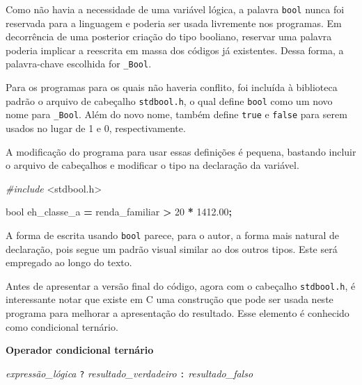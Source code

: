 \documentclass[
  11pt,
  a4paper,
]{scrbook}
\newenvironment{Shaded}{\begin{snugshade}}{\end{snugshade}}
\newcommand{\DataTypeTok}[1]{\textcolor[rgb]{0.13,0.29,0.53}{#1}}
\newcommand{\DecValTok}[1]{\textcolor[rgb]{0.00,0.00,0.81}{#1}}
\newcommand{\FloatTok}[1]{\textcolor[rgb]{0.00,0.00,0.81}{#1}}
\newcommand{\ImportTok}[1]{#1}
\newcommand{\NormalTok}[1]{#1}
\newcommand{\OperatorTok}[1]{\textcolor[rgb]{0.81,0.36,0.00}{\textbf{#1}}}
\newcommand{\PreprocessorTok}[1]{\textcolor[rgb]{0.56,0.35,0.01}{\textit{#1}}}
\begin{document}
Como não havia a necessidade de uma variável lógica, a palavra
\texttt{bool} nunca foi reservada para a linguagem e poderia ser usada
livremente nos programas. Em decorrência de uma posterior criação do
tipo booliano, reservar uma palavra poderia implicar a reescrita em
massa dos códigos já existentes. Dessa forma, a palavra-chave escolhida
for \texttt{\_Bool}.

Para os programas para os quais não haveria conflito, foi incluída à
biblioteca padrão o arquivo de cabeçalho \texttt{stdbool.h}, o qual
define \texttt{bool} como um novo nome para \texttt{\_Bool}. Além do
novo nome, também define \texttt{true} e \texttt{false} para serem
usados no lugar de 1 e 0, respectivamente.

A modificação do programa para usar essas definições é pequena, bastando
incluir o arquivo de cabeçalhos e modificar o tipo na declaração da
variável.

\begin{Shaded}
\begin{Highlighting}[]
\PreprocessorTok{\#include }\ImportTok{\textless{}stdbool.h\textgreater{}}
\end{Highlighting}
\end{Shaded}

\begin{Shaded}
\begin{Highlighting}[]
\DataTypeTok{bool}\NormalTok{ eh\_classe\_a }\OperatorTok{=}\NormalTok{ renda\_familiar }\OperatorTok{\textgreater{}} \DecValTok{20} \OperatorTok{*} \FloatTok{1412.00}\OperatorTok{;}
\end{Highlighting}
\end{Shaded}

A forma de escrita usando \texttt{bool} parece, para o autor, a forma
mais natural de declaração, pois segue um padrão visual similar ao dos
outros tipos. Este será empregado ao longo do texto.

Antes de apresentar a versão final do código, agora com o cabeçalho
\texttt{stdbool.h}, é interessante notar que existe em C uma construção
que pode ser usada neste programa para melhorar a apresentação do
resultado. Esse elemento é conhecido como condicional ternário.

\begin{tcolorbox}[enhanced jigsaw, colback=white, arc=.35mm, colframe=quarto-callout-color-frame, toprule=.15mm, leftrule=.75mm, left=2mm, rightrule=.15mm, bottomrule=.15mm, opacityback=0, breakable]

\vspace{-3mm}\textbf{Operador condicional ternário}\vspace{3mm}

\emph{expressão\_lógica} \texttt{?} \emph{resultado\_verdadeiro}
\texttt{:} \emph{resultado\_falso}

\end{tcolorbox}
\end{document}
